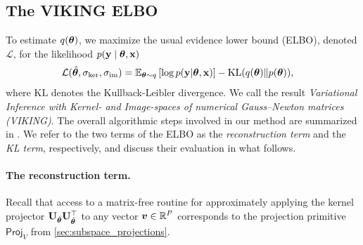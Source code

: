 \subsection{The VIKING ELBO}

To estimate \(q(\bm{\theta})\), we maximize the usual evidence lower bound (ELBO), denoted \(\mathcal L\), for the likelihood \(p(\mathbf{y}\mid \bm{\theta},\mathbf{x})\)
\begin{align}
  \label{eq:elbo}
  \mathcal{L}(\hat{\bm{\theta}}, \sigma_{\ker}, \sigma_{\operatorname{im}})
    &= \mathbb{E}_{\bm{\theta} \sim q}\left[ \log p(\mathbf{y} | \bm{\theta}, \mathbf{x}) \right]
     - \mathrm{KL}( q(\bm{\theta}) \| p(\bm{\theta}) ),
\end{align}
where $\mathrm{KL}$ denotes the Kullback-Leibler divergence.
We call the result \emph{Variational Inference with Kernel- and Image-spaces of numerical Gauss--Newton matrices (VIKING)}.
The overall algorithmic steps involved in our method are summarized in .
We refer to the two terms of the ELBO as the \emph{reconstruction term} and the \emph{KL term}, respectively, and discuss their evaluation in what follows.

\paragraph{The reconstruction term.}
Recall that access to a matrix-free routine for approximately applying the kernel projector \(\mathbf{U}_{\hat{\bm{\theta}}}\mathbf{U}_{\hat{\bm{\theta}}}^{\top}\) to any vector \(\bm{v}\in\mathbb{R}^P\) corresponds to the projection primitive $\textsf{Proj}_V$ from \cref{sec:subspace_projections}.

